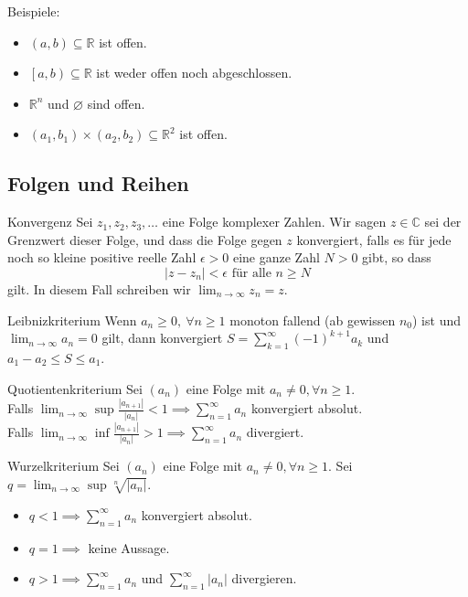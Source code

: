 \documentclass[a4paper,10pt]{article}
\def\limn{\lim_{n\to \infty}}
\def\sumk{\sum_{k=1}^\infty}
\def\R{\mathbb{R}}
\begin{document}
Beispiele:
\begin{itemize}
  \item \((a,b) \subseteq \R\) ist offen.
  \item \(\left[a,b\right) \subseteq \R\) ist weder offen noch abgeschlossen.
  \item \(\R^n\) und \(\varnothing\) sind offen.
  \item \((a_1, b_1) \times (a_2,b_2) \subseteq \R^2\) ist offen.
\end{itemize}

\subsection{Folgen und Reihen}

\begin{mainbox}{Konvergenz}
  Sei \(z_1,z_2,z_3,\ldots\) eine Folge komplexer Zahlen. Wir sagen \(z \in \mathbb{C}\) sei der Grenzwert dieser Folge, und dass die Folge gegen \(z\) konvergiert, falls es für jede noch so kleine positive reelle Zahl \(\epsilon>0\) eine ganze Zahl \(N>0\) gibt, so dass \[|z-z_n|<\epsilon \text{ für alle } n\geq N \] gilt. In diesem Fall schreiben wir \(\displaystyle\lim_{n\to\infty}z_n=z\).
\end{mainbox}

\begin{subbox}{Leibnizkriterium}
Wenn $a_n \ge 0, \ \forall n \ge 1$ monoton fallend (ab gewissen $n_0$) ist und $\limn a_n = 0$ gilt, dann konvergiert $S = \sumk (-1)^{k+1} a_k$ und $a_1 - a_2 \le S \le a_1$.
\end{subbox}

\begin{mainbox}{Quotientenkriterium}
Sei $(a_n)$ eine Folge mit $a_n \ne 0, \forall n \ge 1$. \\ Falls $\limn \sup \frac{|a_{n+1}|}{|a_n|} < 1 \implies \sum_{n=1}^\infty a_n$ konvergiert absolut. \\Falls $\limn \inf \frac{|a_{n+1}|}{|a_n|} > 1 \implies \sum_{n=1}^\infty a_n$ divergiert.  
\end{mainbox}

\begin{mainbox}{Wurzelkriterium}
Sei $(a_n)$ eine Folge mit $a_n \ne 0, \forall n \ge 1$. Sei $q = \limn \sup \sqrt[n]{|a_n|}$. 
\begin{itemize}
 \item $q < 1 \implies \sum_{n=1}^\infty a_n$ konvergiert absolut.
 \item $q = 1 \implies$ keine Aussage.
 \item $q > 1 \implies \sum_{n=1}^\infty a_n$ und $\sum_{n=1}^\infty |a_n|$ divergieren.
\end{itemize}
\end{mainbox}
\end{document}
